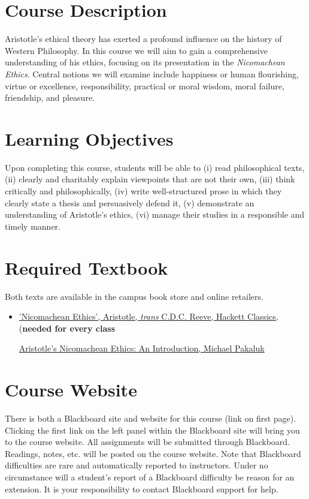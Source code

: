 \documentclass[article,oneside]{memoir}
\begin{document}
\section{Course Description}

Aristotle's ethical theory has exerted a profound influence on the history of Western Philosophy.  In this course we will aim to gain a comprehensive understanding of his ethics, focusing on its presentation in the \emph{Nicomachean Ethics}.  Central notions we will examine include happiness or human  flourishing, virtue or excellence, responsibility, practical or moral wisdom, moral failure, friendship,  and pleasure.   


\section{Learning Objectives}

Upon completing this course, students will be able to (i) read philosophical texts, (ii) clearly and charitably explain viewpoints that are not their own, (iii) think critically and philosophically, (iv)
write well-structured prose in which they clearly state a thesis and persuasively defend it, (v) demonstrate an understanding of Aristotle's ethics, (vi) manage their studies in a responsible and timely manner. 




\section{Required Textbook}

Both texts are available in the campus book store and online retailers.

\begin{itemize}
\item
\href{https://www.amazon.com/Nicomachean-Ethics-Hackett-Classics-Aristotle/dp/1624661173/ref=sr_1_16?ie=UTF8&qid=1473024493&sr=8-16&keywords=aristotle%27s+nicomachean+ethics}{'Nicomachean Ethics', Aristotle, \emph{trans} C.D.C. Reeve, Hackett Classics}, (\textbf{needed for every class}

  \href{https://www.amazon.com/Aristotles-Nicomachean-Ethics-Introductions-Philosophical/dp/0521520681/ref=sr_1_1?ie=UTF8&qid=1473039378&sr=8-1&keywords=nicomachean+ethics+pakaluk}{Aristotle's Nicomachean Ethics: An Introduction, Michael Pakaluk} 
\end{itemize}


\section{Course Website}
There is both a Blackboard site and website for this course (link on first page). Clicking the first link on the left panel within the Blackboard site will bring you to the course website. All assignments will be submitted through Blackboard. Readings, notes, etc. will be posted on the course website. Note that Blackboard difficulties are rare and automatically reported to instructors. Under no circumstance will a student's report of a Blackboard difficulty be reason for an extension. It is your responsibility to contact Blackboard support for help.
\end{document}
